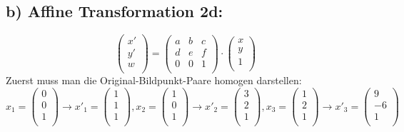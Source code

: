 \documentclass{article}
\begin{document}
\subsection*{b) Affine Transformation 2d:}
$$
\begin{pmatrix}
    x' \\
    y' \\
    w \\
\end{pmatrix}
=
\begin{pmatrix}
    a & b & c \\
    d & e & f \\
    0 & 0 & 1 \\
\end{pmatrix}
\cdot
\begin{pmatrix}
    x \\
    y \\
    1 \\
\end{pmatrix}
$$
Zuerst muss man die Original-Bildpunkt-Paare homogen darstellen:
$$
x_1 =
\begin{pmatrix}
    0 \\
    0 \\
    1 \\
\end{pmatrix}
\rightarrow x'_1 =
\begin{pmatrix}
    1 \\
    1 \\
    1 \\
\end{pmatrix}, 
x_2 =
\begin{pmatrix}
    1 \\
    0 \\
    1 \\
\end{pmatrix}
\rightarrow x'_2 =
\begin{pmatrix}
    3 \\
    2 \\
    1 \\
\end{pmatrix},
x_3 =
\begin{pmatrix}
    1 \\
    2 \\
    1 \\
\end{pmatrix}
\rightarrow x'_3 =
\begin{pmatrix}
    9 \\
    -6 \\
    1 \\
\end{pmatrix}
$$
\end{document}
